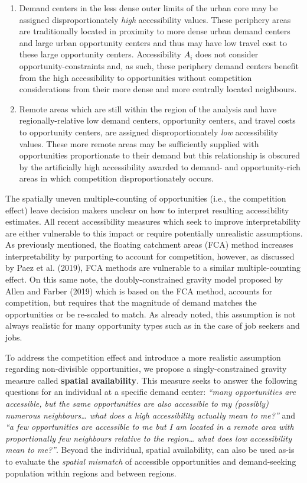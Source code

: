 \documentclass[]{elsarticle} %
\begin{document}
\begin{enumerate}
\def\labelenumi{\arabic{enumi})}
\item
  Demand centers in the less dense outer limits of the urban core may be
  assigned disproportionately \emph{high} accessibility values. These
  periphery areas are traditionally located in proximity to more dense
  urban demand centers and large urban opportunity centers and thus may
  have low travel cost to these large opportunity centers. Accessibility
  \(A_i\) does not consider opportunity-constraints and, as such, these
  periphery demand centers benefit from the high accessibility to
  opportunities without competition considerations from their more dense
  and more centrally located neighbours.
\item
  Remote areas which are still within the region of the analysis and
  have regionally-relative low demand centers, opportunity centers, and
  travel costs to opportunity centers, are assigned disproportionately
  \emph{low} accessibility values. These more remote areas may be
  sufficiently supplied with opportunities proportionate to their demand
  but this relationship is obscured by the artificially high
  accessibility awarded to demand- and opportunity-rich areas in which
  competition disproportionately occurs.
\end{enumerate}

The spatially uneven multiple-counting of opportunities (i.e., the
competition effect) leave decision makers unclear on how to interpret
resulting accessibility estimates. All recent accessibility measures
which seek to improve interpretability are either vulnerable to this
impact or require potentially unrealistic assumptions. As previously
mentioned, the floating catchment areas (FCA) method increases
interpretability by purporting to account for competition, however, as
discussed by Paez et al. (2019), FCA methods are vulnerable to a similar
multiple-counting effect. On this same note, the doubly-constrained
gravity model proposed by Allen and Farber (2019) which is based on the
FCA method, accounts for competition, but requires that the magnitude of
demand matches the opportunities or be re-scaled to match. As already
noted, this assumption is not always realistic for many opportunity
types such as in the case of job seekers and jobs.

To address the competition effect and introduce a more realistic
assumption regarding non-divisible opportunities, we propose a
singly-constrained gravity measure called \textbf{spatial availability}.
This measure seeks to answer the following questions for an individual
at a specific demand center: \emph{``many opportunities are accessible,
but the same opportunities are also accessible to my (possibly) numerous
neighbours\ldots{} what does a high accessibility actually mean to
me?''} and \emph{``a few opportunities are accessible to me but I am
located in a remote area with proportionally few neighbours relative to
the region\ldots{} what does low accessibility mean to me?''}. Beyond
the individual, spatial availability, can also be used as-is to evaluate
the \emph{spatial mismatch} of accessible opportunities and
demand-seeking population within regions and between regions.
\end{document}
